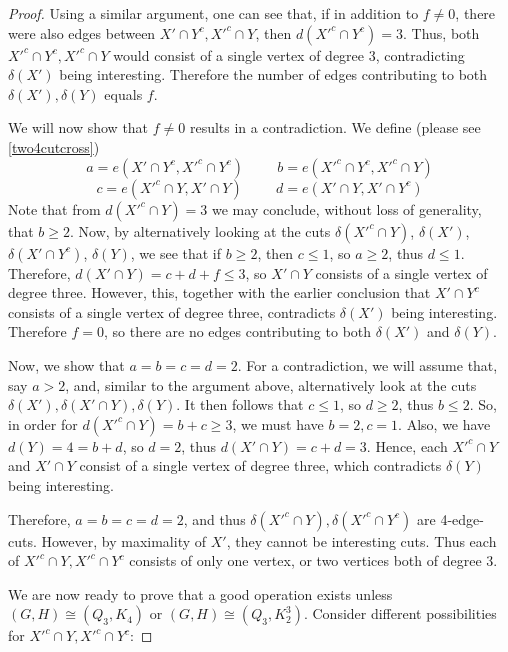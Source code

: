 \documentclass[letterpaper,11pt]{article}
\theoremstyle{definition}
\begin{document}
\begin{proof}
Using a similar argument, one can see that, if in addition to $f \neq 0$, there were also edges between $X'\cap Y^c, {X'}^c\cap Y$,
 then $d({X'}^c \cap Y^c)=3$. Thus, both ${X'}^c \cap Y^c, {X'}^c \cap Y$ would consist of a single vertex of degree $3$, contradicting $\delta (X')$ being interesting. Therefore the number of edges contributing to both $\delta(X'), \delta (Y)$ equals $f$.

We will now show that $f \neq 0$ results in a contradiction. We define (please see \cref{two4cutcross})
\[a = e(X'\cap Y^c, {X'}^c \cap Y^c) \hspace{1cm} b = e( {X'}^c \cap Y^c,  {X'}^c \cap Y)\]
\[c = e( {X'}^c \cap Y, X' \cap Y) \hspace{1cm} d= e(X'\cap Y, X'\cap Y^c)\]
 Note that from $d({X'}^c \cap Y)=3$ we may conclude, without loss of generality, that $b \geq 2$. Now, by alternatively looking at the cuts $\delta ({X'}^c\cap Y)$, $\delta (X')$, $\delta (X'\cap Y^c)$, $\delta (Y) $, we see that if $b\ge 2$, then $c\le 1$, so $a \ge 2$, thus $d \le 1$. Therefore, $d(X'\cap Y)=c+ d+ f \le 3$, so $X'\cap Y$ consists of a single vertex of degree three. However, this, together with the earlier conclusion that $X'\cap Y^c$ consists of a single vertex of degree three, contradicts $\delta(X')$ being interesting. Therefore $f=0$, so there are no edges contributing to both $\delta(X')$ and $\delta(Y)$.

Now, we show that $a=b=c=d=2$. For a contradiction, we will assume that, say $a>2$, and, similar to the argument above, alternatively look at the cuts $ \delta (X'), \delta (X'\cap Y), \delta (Y) $. It then follows that $c\le 1$, so $d \ge 2$, thus $b\le 2$. So, in order for $d({X'}^c\cap Y)=b+c\ge 3$, we must have $b=2, c=1$. Also, we have $d(Y)=4=b+d$, so $d=2$, thus $d(X'\cap Y)=c+d=3$. 
Hence, each ${X'}^c\cap Y$ and $X'\cap Y$ consist of a single vertex of degree three, which contradicts $\delta(Y)$ being interesting.

Therefore, $a=b=c=d=2$, and thus $\delta({X'}^{c} \cap Y), \delta({X'}^c \cap Y^c)$ are 4-edge-cuts. However, by maximality of $X'$, they cannot be interesting cuts. Thus each of ${X'}^{c} \cap Y, {X'}^c \cap Y^c$ consists of only one vertex, or two vertices both of degree 3.

We are now ready to prove that a good operation exists unless $(G, H) \cong (Q_3, K_4)$ or $(G, H) \cong (Q_3, K_2^3)$. Consider different possibilities for ${X'}^{c} \cap Y, {X'}^c \cap Y^c$:


\end{proof}
\end{document}
